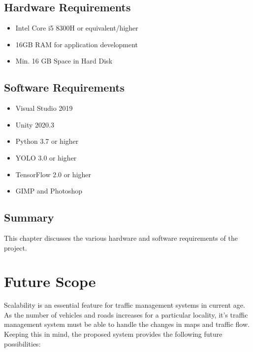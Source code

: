 \documentclass[openany,12pt]{report}
\begin{document}
	\newpage
	\section{Hardware Requirements}
	\begin{itemize}
		\item{Intel Core i5 8300H or equivalent/higher}
		\item{16GB RAM for application development}
		\item{Min. 16 GB Space in Hard Disk}
	\end{itemize}
	
	\section{Software Requirements}
	\begin{itemize}
		\item{Visual Studio 2019}
		\item{Unity 2020.3}
		\item{Python 3.7 or higher}
		\item{YOLO 3.0 or higher}
		\item{TensorFlow 2.0 or higher}
		\item{GIMP and Photoshop}
	\end{itemize}
	
	\section{Summary}
	\hspace*{0.5in}This chapter discusses the various hardware and software requirements of the project.
	\chapter {Future Scope}
	
	\hspace{0.5in}Scalability is an essential feature for traffic management systems in current age. As the number of vehicles and roads increases for a particular locality, it's traffic management system must be able to handle the changes in maps and traffic flow. Keeping this in mind, the proposed system provides the following future possibilities:\\
	
\end{document}
